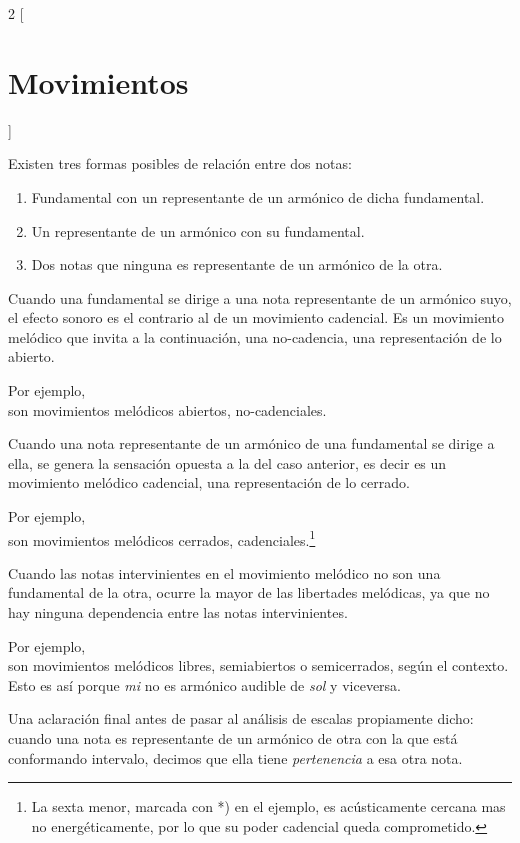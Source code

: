 \documentclass[a4paper,10pt]{article}
\begin{document}
\begin{multicols}{2}
[\section{Movimientos}\label{sec:movimientos}]

  Existen tres formas posibles de relación entre dos notas:
  \begin{enumerate}
    \item Fundamental con un representante de un armónico de dicha fundamental.
    \item Un representante de un armónico con su fundamental.
    \item Dos notas que ninguna es representante de un armónico de la otra.
  \end{enumerate}

  Cuando una fundamental se dirige a una nota representante de un armónico suyo, el efecto sonoro es el contrario al de un movimiento cadencial. Es un movimiento melódico que invita a la continuación, una no-cadencia, una representación de lo abierto.

  Por ejemplo, \\   son movimientos melódicos abiertos, no-cadenciales.

  Cuando una nota representante de un armónico de una fundamental se dirige a ella, se genera la sensación opuesta a la del caso anterior, es decir es un movimiento melódico cadencial, una representación de lo cerrado.

  Por ejemplo, \\  son movimientos melódicos cerrados, cadenciales.\footnote{La sexta menor, marcada con *) en el ejemplo, es acústicamente cercana mas no energéticamente, por lo que su poder cadencial queda comprometido.}

  Cuando las notas intervinientes en el movimiento melódico no son una fundamental de la otra, ocurre la mayor de las libertades melódicas, ya que no hay ninguna dependencia entre las notas intervinientes.

  Por ejemplo, \\   son movimientos melódicos libres, semiabiertos o semicerrados, según el contexto. Esto es así porque \emph{mi} no es armónico audible de \emph{sol} y viceversa.

  Una aclaración final antes de pasar al análisis de escalas propiamente dicho: cuando una nota es representante de un armónico de otra con la que está conformando intervalo, decimos que ella tiene \emph{pertenencia} a esa otra nota.
\end{multicols}
\end{document}
